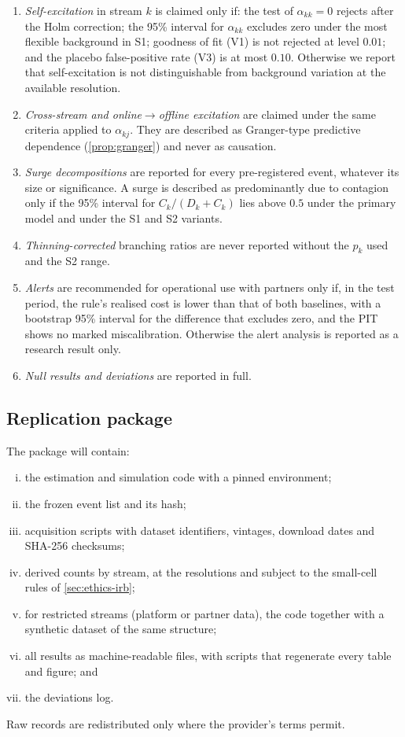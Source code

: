 \begin{enumerate}[D1.]
  \item \emph{Self-excitation} in stream $k$ is claimed only if: the test of
  $\alpha_{kk}=0$ rejects after the Holm correction; the 95\% interval for
  $\alpha_{kk}$ excludes zero under the most flexible background in S1;
  goodness of fit (V1) is not rejected at level $0.01$; and the placebo
  false-positive rate (V3) is at most $0.10$. Otherwise we report that
  self-excitation is not distinguishable from background variation at the
  available resolution.
  \item \emph{Cross-stream and online$\to$offline excitation} are claimed
  under the same criteria applied to $\alpha_{kj}$. They are described as
  Granger-type predictive dependence (\cref{prop:granger}) and never as
  causation.
  \item \emph{Surge decompositions} are reported for every pre-registered
  event, whatever its size or significance. A surge is described as
  predominantly due to contagion only if the 95\% interval for
  $C_k/(D_k+C_k)$ lies above $0.5$ under the primary model and under the
  S1 and S2 variants.
  \item \emph{Thinning-corrected} branching ratios are never reported
  without the $p_k$ used and the S2 range.
  \item \emph{Alerts} are recommended for operational use with partners only
  if, in the test period, the rule's realised cost is lower than that of
  both baselines, with a bootstrap 95\% interval for the difference that
  excludes zero, and the PIT shows no marked miscalibration. Otherwise the
  alert analysis is reported as a research result only.
  \item \emph{Null results and deviations} are reported in full.
\end{enumerate}

\subsection{Replication package}\label{sec:plan-replication}

The package will contain:
\begin{enumerate}[(i)]
  \item the estimation and simulation code with a pinned environment;
  \item the frozen event list and its hash;
  \item acquisition scripts with dataset identifiers, vintages, download
  dates and SHA-256 checksums;
  \item derived counts by stream, at the resolutions and subject to the
  small-cell rules of \cref{sec:ethics-irb};
  \item for restricted streams (platform or partner data), the code together
  with a synthetic dataset of the same structure;
  \item all results as machine-readable files, with scripts that regenerate
  every table and figure; and
  \item the deviations log.
\end{enumerate}
Raw records are redistributed only where the provider's terms permit.

